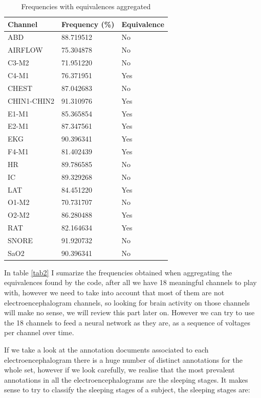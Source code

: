 \begin{minipage}{0.45\textwidth}
\begin{table}[H]
\begin{center}
\begin{tabular}{ |p{3cm}||p{3cm}||p{3cm}| }
 \hline
 Channel & Frequency (\%) & Equivalence\\
 \hline
 ABD & 88.719512 & No \\ 
 AIRFLOW & 75.304878 & No \\  
 C3-M2 & 71.951220 & No \\
 C4-M1 & 76.371951 & Yes \\
 CHEST & 87.042683 & No \\
 CHIN1-CHIN2 & 91.310976 & Yes \\
 E1-M1 & 85.365854 & Yes \\
 E2-M1 & 87.347561 & Yes \\
 EKG & 90.396341 & Yes \\
 F4-M1 & 81.402439 & Yes \\
 HR & 89.786585 & No \\
 IC & 89.329268 & No \\
 LAT & 84.451220 & Yes \\
 O1-M2 & 70.731707 & No \\
 O2-M2 & 86.280488 & Yes \\
 RAT & 82.164634 & Yes \\
 SNORE & 91.920732 & No \\
 SaO2 & 90.396341 & No \\
 \hline
\end{tabular}
\end{center}
\caption{Frequencies with equivalences aggregated}
\label{tab2}
\end{table}
\end{minipage}%
\restoregeometry

In table \autoref{tab2} I sumarize the frequencies obtained when aggregating the equivalences found by the code, after all we have 18 meaningful channels to play with, however we need to take into account that most of them are not electroencephalogram channels, so looking for brain activity on those channels will make no sense, we will review this part later on. However we can try to use the 18 channels to feed a neural network as they are, as a sequence of voltages per channel over time. 

If we take a look at the annotation documents associated to each electroencephalogram there is a huge number of distinct annotations for the whole set, however if we look carefully, we realise that the most prevalent annotations in all the electroencephalograms are the sleeping stages. It makes sense to try to classify the sleeping stages of a subject, the sleeping stages are:

